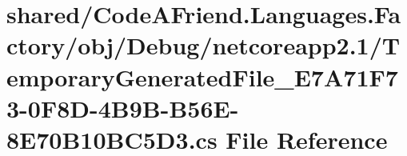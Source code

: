 \hypertarget{shared_2_code_a_friend_8_languages_8_factory_2obj_2_debug_2netcoreapp2_81_2_temporary_generated_14d4459ced10c6457023aed72846edc2}{}\section{shared/\+Code\+A\+Friend.Languages.\+Factory/obj/\+Debug/netcoreapp2.1/\+Temporary\+Generated\+File\+\_\+\+E7\+A71\+F73-\/0\+F8\+D-\/4\+B9\+B-\/\+B56\+E-\/8\+E70\+B10\+B\+C5\+D3.cs File Reference}
\label{shared_2_code_a_friend_8_languages_8_factory_2obj_2_debug_2netcoreapp2_81_2_temporary_generated_14d4459ced10c6457023aed72846edc2}
